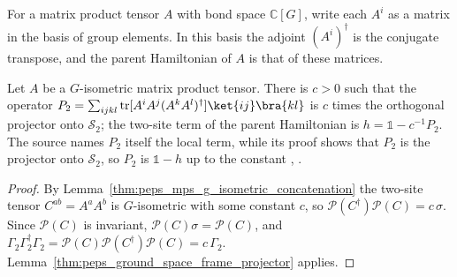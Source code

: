 \begin{definition}%
    \label{def:peps_regular_mps_tensor}
    \leanok
    For a matrix product tensor $A$ with bond space $\mathbb{C}[G]$, write each
    $A^{i}$ as a matrix in the basis of group elements. In this basis the
    adjoint $(A^{i})^{\dagger}$ is the conjugate transpose, and the parent
    Hamiltonian of $A$ is that of these matrices.
\end{definition}

\begin{lemma}%
    \label{thm:peps_mps_g_isometric_local_terms}
    \leanok
    Let $A$ be a $G$-isometric matrix product tensor. There is $c>0$ such that
    the operator
    $P_{2}=\sum_{ijkl}\operatorname{tr}[A^{i}A^{j}(A^{k}A^{l})^{\dagger}]
        \ket{ij}\bra{kl}$ is $c$ times the orthogonal projector onto
    $\mathcal{S}_{2}$; the two-site term of the parent Hamiltonian is
    $h=\mathbb{1}-c^{-1}P_{2}$. The source names $P_{2}$ itself the local term,
    while its proof shows that $P_{2}$ is the projector onto $\mathcal{S}_{2}$,
    so $P_{2}$ is $\mathbb{1}-h$ up to the constant
    \cite[Lemma~6.11]{Schuch2010PEPS},
    \cite{gap:scp10_g_isometric_commuting_parent_hamiltonian}.
\end{lemma}

\begin{proof}\leanok
    By Lemma~\ref{thm:peps_mps_g_isometric_concatenation} the two-site tensor
    $C^{ab}=A^{a}A^{b}$ is $G$-isometric with some constant $c$, so
    $\mathcal{P}(C^{\dagger})\mathcal{P}(C)=c\,\sigma$. Since $\mathcal{P}(C)$
    is invariant, $\mathcal{P}(C)\sigma=\mathcal{P}(C)$, and
    $\Gamma_{2}\Gamma_{2}^{\dagger}\Gamma_{2}=\mathcal{P}(C)\mathcal{P}(C^{\dagger})
        \mathcal{P}(C)=c\,\Gamma_{2}$. Lemma~\ref{thm:peps_ground_space_frame_projector}
    applies.
\end{proof}


